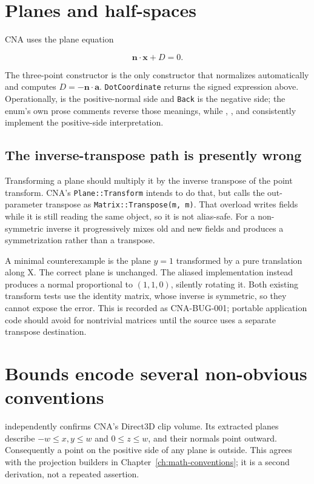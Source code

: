 \section{Planes and half-spaces}

CNA uses the plane equation

\[
  \mathbf{n}\cdot\mathbf{x} + D = 0.
\]

The three-point constructor is the only constructor that normalizes automatically and computes
\(D=-\mathbf{n}\cdot\mathbf{a}\).  \texttt{DotCoordinate} returns the signed expression above.
Operationally,  is the positive-normal side and
\texttt{Back} is the negative side; the enum's own prose comments reverse those meanings, while
, , and  consistently implement the
positive-side interpretation.

\subsection{The inverse-transpose path is presently wrong}

Transforming a plane should multiply it by the inverse transpose of the point transform.  CNA's
\texttt{Plane::}\allowbreak\texttt{Transform} intends to do that, but calls
the out-parameter transpose as
\texttt{Matrix::}\allowbreak\texttt{Transpose(m, m)}.  That overload writes fields while it is
still reading the same
object, so it is not alias-safe.  For a non-symmetric inverse it progressively mixes old and new
fields and produces a symmetrization rather than a transpose.

A minimal counterexample is the plane \(y=1\) transformed by a pure translation along X.  The
correct plane is unchanged.  The aliased implementation instead produces a normal proportional to
\((1,1,0)\), silently rotating it.  Both existing transform tests use the identity matrix, whose
inverse is symmetric, so they cannot expose the error.  This is recorded as CNA-BUG-001; portable
application code should avoid  for nontrivial matrices until the source
uses a separate transpose destination.

\section{Bounds encode several non-obvious conventions}

 independently confirms CNA's Direct3D clip volume.  Its extracted planes
describe \(-w\le x,y\le w\) and \(0\le z\le w\), and their normals point outward.  Consequently a
point on the positive side of any plane is outside.  This agrees with the projection builders in
Chapter~\ref{ch:math-conventions}; it is a second derivation, not a repeated assertion.

